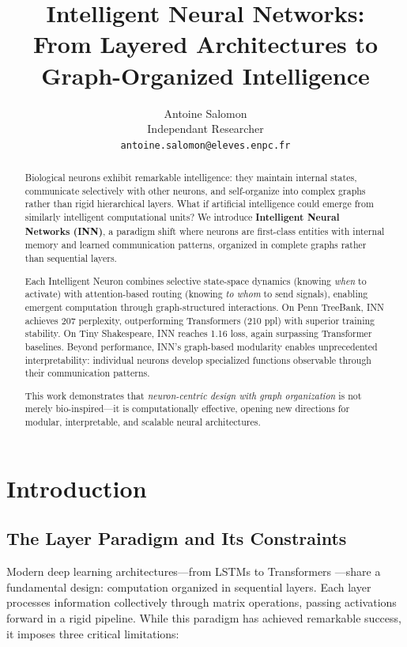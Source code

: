 \documentclass{article}
\title{Intelligent Neural Networks: \\From Layered Architectures to Graph-Organized Intelligence}
\author{
  Antoine Salomon \\
  Independant Researcher \\
  \texttt{antoine.salomon@eleves.enpc.fr}
}
\begin{document}
\maketitle

\begin{abstract}
Biological neurons exhibit remarkable intelligence: they maintain internal states, communicate selectively with other neurons, and self-organize into complex graphs rather than rigid hierarchical layers. What if artificial intelligence could emerge from similarly intelligent computational units? We introduce \textbf{Intelligent Neural Networks (INN)}, a paradigm shift where neurons are first-class entities with internal memory and learned communication patterns, organized in complete graphs rather than sequential layers.

Each Intelligent Neuron combines selective state-space dynamics (knowing \emph{when} to activate) with attention-based routing (knowing \emph{to whom} to send signals), enabling emergent computation through graph-structured interactions. On Penn TreeBank, INN achieves 207 perplexity, outperforming Transformers (210 ppl) with superior training stability. On Tiny Shakespeare, INN reaches 1.16 loss, again surpassing Transformer baselines. Beyond performance, INN's graph-based modularity enables unprecedented interpretability: individual neurons develop specialized functions observable through their communication patterns.

This work demonstrates that \emph{neuron-centric design with graph organization} is not merely bio-inspired—it is computationally effective, opening new directions for modular, interpretable, and scalable neural architectures.
\end{abstract}

\section{Introduction}

\subsection{The Layer Paradigm and Its Constraints}

Modern deep learning architectures—from LSTMs \cite{hochreiter1997long} to Transformers \cite{vaswani2017attention}—share a fundamental design: computation organized in sequential layers. Each layer processes information collectively through matrix operations, passing activations forward in a rigid pipeline. While this paradigm has achieved remarkable success, it imposes three critical limitations:
\end{document}
